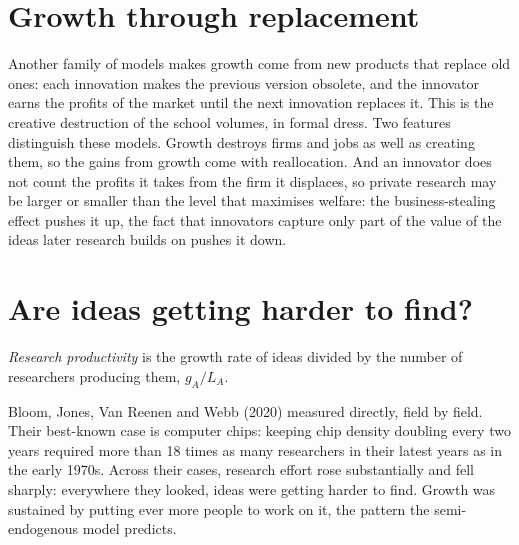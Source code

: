 \section{Growth through replacement}\label{sec:b2:endogenous-growth:replacement}

Another family of models makes growth come from new products that replace old ones: each innovation makes the previous
version obsolete, and the innovator earns the profits of the market until the next innovation replaces it. This is
the creative destruction of the school volumes, in formal dress. Two features distinguish these models. Growth destroys
firms and jobs as well as creating them, so the gains from growth come with reallocation. And an innovator does not count
the profits it takes from the firm it displaces, so private research may be larger or smaller than the level that
maximises welfare: the business-stealing effect pushes it up, the fact that innovators capture only part of the value of
the ideas later research builds on pushes it down.

\section{Are ideas getting harder to find?}\label{sec:b2:endogenous-growth:harder}

\begin{definition}\label{def:b2:endogenous-growth:research-productivity}
\emph{Research productivity} is the growth rate of ideas divided by the number of
researchers producing them, $g_A/L_A$.
\end{definition}

\begin{record}
Bloom, Jones, Van Reenen and Webb (2020) measured  directly, field by field. Their best-known case is
computer chips: keeping chip density doubling every two years required more than 18 times as many researchers in their latest
years as in the early 1970s. Across their cases, research effort rose substantially and  fell
sharply: everywhere they looked, ideas were getting harder to find. Growth was sustained by putting ever more
people to work on it, the pattern the semi-endogenous model predicts.
\end{record}

